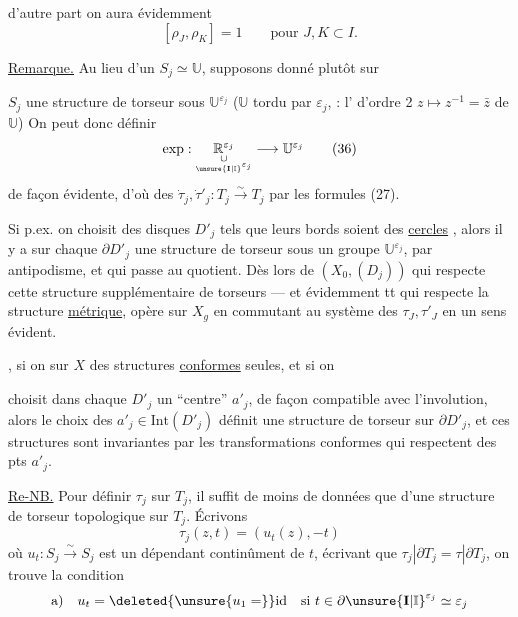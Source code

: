 d'autre part on aura évidemment
\[
[\rho_J,\rho_K]=1\qquad\text{pour }J,K\subset I.
\tag{33}
\]

\uline{Remarque.} Au lieu d'un  $S_j\simeq\mathbb U$,
supposons donné plutôt sur


$S_j$ une structure de torseur sous $\mathbb U^{\varepsilon_j}$
($\mathbb U$ tordu par $\varepsilon_j$,  : l' d'ordre 2
$z\longmapsto z^{-1}=\bar z$ de $\mathbb U$) On peut donc définir
\[
\exp:\underset{\underset{\unsure{\mathbf I|\mathbb I}^{\varepsilon_j}}{\cup}}{\mathbb R^{\varepsilon_j}}
\longrightarrow\mathbb U^{\varepsilon_j}
\tag{36}
\]
de façon évidente, d'où des 
$\dot\tau_j,\dot\tau'_j:T_j\xrightarrow{\sim}T_j$ par les formules (27).

Si p.ex. on choisit des disques $D'_j$ tels que leurs bords soient des \uline{cercles}
, alors il y a sur chaque  $\partial D'_j$
une structure de torseur sous un groupe $\mathbb U^{\varepsilon_j}$,
 par antipodisme, et qui passe au quotient.
Dès lors   de $(X_0,(D_j))$ qui respecte cette
structure supplémentaire de torseurs --- et évidemment tt  qui respecte
la structure \uline{métrique},  opère sur $X_g$ en commutant
au système des $\tau_J,\tau'_J$ en un sens évident.

, si on   sur $X$
des structures \uline{conformes} seules, et si on


choisit dans chaque $D'_j$ un ``centre'' $a'_j$, de façon compatible avec l'involution,
alors le choix des $a'_j\in\mathrm{Int}(D'_j)$ définit une structure de torseur sur
$\partial D'_j$\unsure{\textsuperscript{*}}, et ces structures sont invariantes par les
transformations conformes qui respectent  des pts $a'_j$.


\uline{Re-NB.} Pour définir $\tau_j$ sur $T_j$, il suffit de 
moins de données que d'une structure de torseur topologique sur $T_j$.
Écrivons 
\[
\tau_j(z,t)=(u_t(z),-t)
\tag{37}
\]
où $u_t:S_j\xrightarrow{\sim}S_j$ est un  dépendant continûment de $t$,
écrivant que $\tau_j|\partial T_j=\tau|\partial T_j$, on trouve la condition
\[
\text{a)}\quad u_t=\deleted{\unsure{u_1=}}\mathrm{id}
\quad\text{si }t\in\partial\unsure{\mathbf I|\mathbb I}^{\varepsilon_j}\simeq\varepsilon_j
\]

